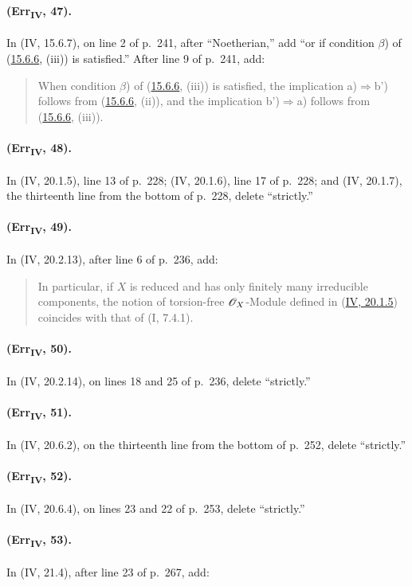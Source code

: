 {\paragraph{(Err\textsubscript{IV}, 47).}
In (IV, 15.6.7), on line 2 of p.~241, after ``Noetherian,'' add ``or if
condition $\beta$) of ({\hyperref[IV.15.6.6]{15.6.6}}, (iii)) is satisfied.''  After line 9 of
p.~241, add:
\begin{quote}
When condition $\beta$) of ({\hyperref[IV.15.6.6]{15.6.6}}, (iii)) is satisfied, the implication
a)$\Rightarrow$b') follows from ({\hyperref[IV.15.6.6]{15.6.6}}, (ii)), and the implication
b')$\Rightarrow$a) follows from ({\hyperref[IV.15.6.6]{15.6.6}}, (iii)).
\end{quote}

\paragraph{(Err\textsubscript{IV}, 48).}
In (IV, 20.1.5), line 13 of p.~228; (IV, 20.1.6), line 17 of p.~228;
and (IV, 20.1.7), the thirteenth line from the bottom of p.~228, delete
``strictly.''

\paragraph{(Err\textsubscript{IV}, 49).}
In (IV, 20.2.13), after line 6 of p.~236, add:
\begin{quote}
In particular, if $X$ is reduced and has only finitely many irreducible
components, the notion of torsion-free $\mathscr{O}_X$-Module defined in
({\hyperref[IV.20]{IV, 20.1.5}}) coincides with that of (I, 7.4.1).
\end{quote}

\paragraph{(Err\textsubscript{IV}, 50).}
In (IV, 20.2.14), on lines 18 and 25 of p.~236, delete ``strictly.''

\paragraph{(Err\textsubscript{IV}, 51).}
In (IV, 20.6.2), on the thirteenth line from the bottom of p.~252,
delete ``strictly.''

\paragraph{(Err\textsubscript{IV}, 52).}
In (IV, 20.6.4), on lines 23 and 22 of p.~253, delete ``strictly.''

\paragraph{(Err\textsubscript{IV}, 53).}
In (IV, 21.4), after line 23 of p.~267, add:

\def\EGAIVSuppressErratumLabels{1}

\let\EGAIVSuppressErratumLabels\undefined
}

